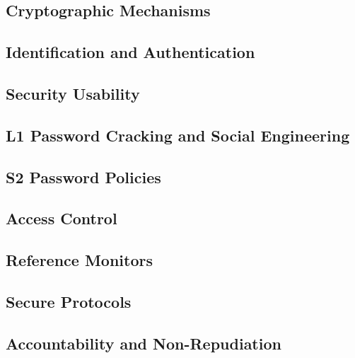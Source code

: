 \subsection{Cryptographic Mechanisms}


\subsection{Identification and Authentication}


\subsection{Security Usability}


\subsection{L1 Password Cracking and Social Engineering}


\subsection{S2 Password Policies}


\subsection{Access Control}


\subsection{Reference Monitors}


%

\subsection{Secure Protocols}


\subsection{Accountability and Non-Repudiation}


